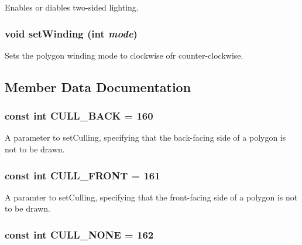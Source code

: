 Enables or diables two-sided lighting. \hypertarget{classm3g_1_1PolygonMode_5535581a651835a0da246b5936c2f0b5}{
\subsubsection[{setWinding}]{\setlength{\rightskip}{0pt plus 5cm}void setWinding (int {\em mode})}}
\label{classm3g_1_1PolygonMode_5535581a651835a0da246b5936c2f0b5}


Sets the polygon winding mode to clockwise ofr counter-clockwise. 

\subsection{Member Data Documentation}
\hypertarget{classm3g_1_1PolygonMode_34ae9162b765ddbc1d2476edf3195361}{
\subsubsection[{CULL\_\-BACK}]{\setlength{\rightskip}{0pt plus 5cm}const int {\bf CULL\_\-BACK} = 160}}
\label{classm3g_1_1PolygonMode_34ae9162b765ddbc1d2476edf3195361}


A parameter to setCulling, specifying that the back-facing side of a polygon is not to be drawn. \hypertarget{classm3g_1_1PolygonMode_efa180528b010979c6f7732c3c3114ae}{
\subsubsection[{CULL\_\-FRONT}]{\setlength{\rightskip}{0pt plus 5cm}const int {\bf CULL\_\-FRONT} = 161}}
\label{classm3g_1_1PolygonMode_efa180528b010979c6f7732c3c3114ae}


A paramter to setCulling, specifying that the front-facing side of a polygon is not to be drawn. \hypertarget{classm3g_1_1PolygonMode_48717ad405f481d0f2ab8e948bf86822}{
\subsubsection[{CULL\_\-NONE}]{\setlength{\rightskip}{0pt plus 5cm}const int {\bf CULL\_\-NONE} = 162}}
\label{classm3g_1_1PolygonMode_48717ad405f481d0f2ab8e948bf86822}



